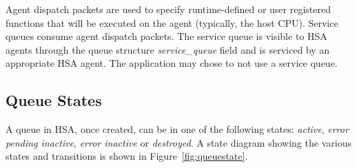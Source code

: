 \documentclass[final]{book}
\newcommand{\reffld}[1]{\textit{#1}}
\begin{document}
Agent dispatch packets are used to specify runtime-defined or user registered
functions that will be executed on the agent (typically, the host CPU). Service
queues consume agent dispatch packets. The service queue is visible to HSA
agents through the queue structure \reffld{service_queue} field and is serviced
by an appropriate HSA agent. The application may chose to not use a service
queue.

\hypertarget{queue-errors}{}\subsection{Queue States} \label{queue-errors}

A queue in HSA, once created, can be in one of the following states:
\emph{active}, \emph{error pending inactive}, \emph{error inactive} or
\emph{destroyed}. A state diagram showing the various states and transitions is
shown in Figure~\ref{fig:queuestate}.
\end{document}
